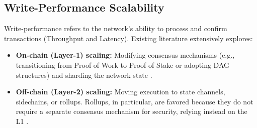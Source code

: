 \subsection{Write-Performance Scalability}
Write-performance refers to the network's ability to process and confirm transactions (Throughput and Latency). Existing literature extensively explores:
\begin{itemize}
    \item \textbf{On-chain (Layer-1) scaling:} Modifying consensus mechanisms (e.g., transitioning from Proof-of-Work to Proof-of-Stake or adopting DAG structures) and sharding the network state \citep{zhou2020solutions}.
    \item \textbf{Off-chain (Layer-2) scaling:} Moving execution to state channels, sidechains, or rollups. Rollups, in particular, are favored because they do not require a separate consensus mechanism for security, relying instead on the L1 \citep{tran2023implementation}.
\end{itemize}
